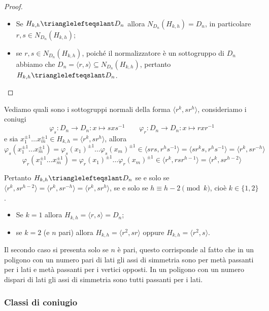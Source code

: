 \documentclass[11pt]{scrartcl}
\begin{document}
\begin{proof}~
    \begin{itemize}
        \item Se $H_{k, h}\trianglelefteqslant D_n$ allora $N_{D_n}(H_{k, h}) = D_n$, 
        in particolare $r, s \in N_{D_n}(H_{k, h})$;
        \item se $r, s \in N_{D_n}(H_{k, h})$, poiché il normalizzatore è un
        sottogruppo di $D_n$ abbiamo che $D_n = \langle r, s\rangle \subseteq
        N_{D_n}(H_{k, h})$, pertanto $H_{k, h} \trianglelefteqslant D_n$.
    \end{itemize}
\end{proof}

Vediamo quali sono i sottogruppi normali della forma 
$\langle r^k, sr^h\rangle$, consideriamo i coniugi \[
    \varphi_s: D_n \longrightarrow D_n :x \longmapsto sxs^{-1}\qquad
    \varphi_r: D_n \longrightarrow D_n :x \longmapsto rxr^{-1}
\]e sia $x_1^{\pm 1}\ldots x_m^{\pm 1} \in H_{k, h} = \langle r^k, sr^h\rangle$, allora
\[
    \varphi_s(x_1^{\pm 1}\ldots x_m^{\pm 1}) = \varphi_s(x_1)^{\pm 1}\ldots \varphi_s(x_m)^{\pm 1}
    \in \langle srs, r^hs^{-1}\rangle = \langle sr^ks, r^hs^{-1}\rangle = \langle
    r^k, sr^{-h}\rangle
\]
\[
    \varphi_r(x_1^{\pm 1}\ldots x_m^{\pm 1}) = \varphi_r(x_1)^{\pm 1}\ldots \varphi_r(x_m)^{\pm 1}
    \in \langle r^k, rsr^{h - 1}\rangle = \langle r^k, sr^{h - 2}\rangle
\]

Pertanto $H_{k, h}\trianglelefteqslant D_n$ se e solo se $\langle r^k, sr^{h - 2}\rangle
= \langle r^k, sr^{-h}\rangle = \langle r^k, sr^h\rangle$, se e solo se 
$h \equiv h - 2 \pmod k$, cioè $k \in \{1, 2\}$.\begin{itemize}
    \item Se $k = 1$ allora $H_{k, h} = \langle r, s\rangle = D_n$;
    \item se $k = 2$ (e $n$ pari) allora $H_{k, h} = \langle r^2, sr\rangle$ oppure 
    $H_{k, h} = \langle r^2, s\rangle$.
\end{itemize}

\begin{remark}
    Il secondo caso si presenta solo se $n$ è pari, questo corrisponde al fatto 
    che in un poligono con un numero pari di lati gli assi di simmetria sono 
    per metà passanti per i lati e metà passanti per i vertici opposti. In un poligono con un numero dispari
    di lati gli assi di simmetria sono tutti passanti per i lati.
\end{remark}


\subsubsection{Classi di coniugio}
\end{document}
